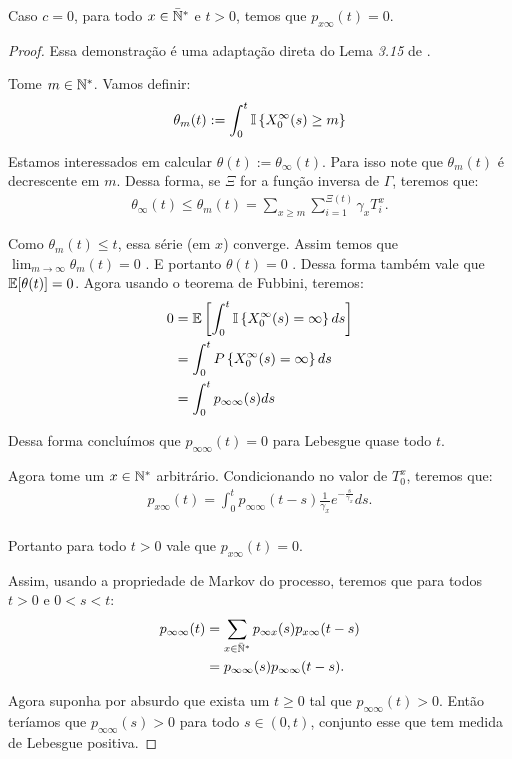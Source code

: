 \begin{proposicao}
  \label{prop:naocontinuidade}
  Caso $c = 0$, para todo $x \in {\mathbb{\bar{N}^*}}$ e $t > 0$, temos que $p_{x
    \infty} (t) = 0$.
\end{proposicao}
\begin{proof}
  Essa demonstração é uma adaptação direta do Lema \emph{3.15} de
  \cite{fontes:08}.

  Tome $m \in {\mathbb{N^*}}$. Vamos definir:
  \begin{align*}
    \theta_m(t) := \int_0^t {\mathbb{I}} \left\{ X^\infty_0(s) \geq m \right\}
  \end{align*}

  Estamos interessados em calcular $\theta(t) :=
  \theta_\infty(t)$. Para isso note que $\theta_m(t)$ é decrescente em
  $m$. Dessa forma, se $\Xi$ for a função inversa de $\Gamma$, teremos
  que:
  \begin{align*}
    \theta_\infty(t) \leq \theta_m(t) = \sum_{x \geq m}
    \sum_{i=1}^{\Xi(t)} \gamma_x T^x_i.
  \end{align*}


  Como $\theta_m(t) \leq t$, essa série (em $x$) converge. Assim temos
  que $\lim_{m\to\infty} \theta_m(t) = 0$ \qc. E portanto $\theta(t) =
  0$ \qc. Dessa forma também vale que ${\mathbb{E}}[\theta(t)] = 0$. Agora
  usando o teorema de Fubbini, teremos:
  \begin{align*}
    0 &= {\mathbb{E}}\left[ \int_0^t {\mathbb{I}} \left\{ X^\infty_0(s) = \infty
      \right\} ds \right]\\
    &= \int_0^t P \left\{ X^\infty_0(s) = \infty
    \right\} ds\\
    &= \int_0^t p_{\infty \infty} (s) ds
  \end{align*}

  Dessa forma concluímos que $p_{\infty \infty} (t) = 0$ para Lebesgue
  quase todo $t$.

  Agora tome um $x \in {\mathbb{N^*}}$ arbitrário. Condicionando no valor de
  $T^x_0$, teremos que:
  \begin{align*}
    p_{x \infty} (t) = \int_0^t p_{\infty \infty} (t-s)
    \frac{1}{\gamma_x}e^{-\frac{s}{\gamma_x}} ds.\\
  \end{align*}

  Portanto para todo $t > 0$ vale que $p_{x \infty} (t) = 0$.

  Assim, usando a propriedade de Markov do processo, teremos que para
  todos $t> 0$ e $0 < s < t$:
  \begin{align*}
    p_{\infty \infty} (t) &= \sum_{x \in {\mathbb{\bar{N}^*}}} p_{\infty x}(s) p_{x
      \infty} (t-s)\\
    &= p_{\infty \infty} (s) p_{\infty \infty} (t-s).
  \end{align*}

  Agora suponha por absurdo que exista um $t \geq 0$ tal que
  $p_{\infty \infty} (t) > 0$. Então teríamos que $p_{\infty
    \infty}(s) > 0$ para todo $s \in (0, t)$, conjunto esse que tem
  medida de Lebesgue positiva.
\end{proof}


